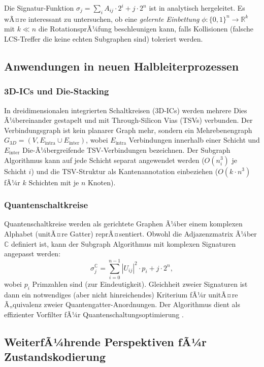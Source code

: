 ﻿\documentclass[a4paper,12pt]{article}
\theoremstyle{definition}
\begin{document}
Die Signatur-Funktion $\sigma_j = \sum_i A_{ij} \cdot 2^i + j \cdot 2^n$ ist in
\cite{subgraph2026} analytisch hergeleitet. Es wÃ¤re interessant zu untersuchen, ob
eine \emph{gelernte Einbettung} $\phi: \{0,1\}^n \to \mathbb{R}^k$ mit $k \ll n$
die RotationsprÃ¼fung beschleunigen kann, falls Kollisionen (falsche LCS-Treffer die
keine echten Subgraphen sind) toleriert werden.

\subsection{Anwendungen in neuen Halbleiterprozessen}

\subsubsection{3D-ICs und Die-Stacking}

In dreidimensionalen integrierten Schaltkreisen (3D-ICs) werden mehrere Dies Ã¼bereinander
gestapelt und mit Through-Silicon Vias (TSVs) verbunden. Der Verbindungsgraph ist kein
planarer Graph mehr, sondern ein Mehrebenengraph $G_{3D} = (V, E_{\text{intra}} \cup E_{\text{inter}})$,
wobei $E_{\text{intra}}$ Verbindungen innerhalb einer Schicht und $E_{\text{inter}}$
Die-Ã¼bergreifende TSV-Verbindungen bezeichnen. Der Subgraph Algorithmus kann auf
jede Schicht separat angewendet werden ($O(n_i^3)$ je Schicht $i$) und die TSV-Struktur
als Kantenannotation einbeziehen ($O(k \cdot n^3)$ fÃ¼r $k$ Schichten mit je $n$ Knoten).

\subsubsection{Quantenschaltkreise}

Quantenschaltkreise werden als gerichtete Graphen Ã¼ber einem komplexen Alphabet
(unitÃ¤re Gatter) reprÃ¤sentiert. Obwohl die Adjazenzmatrix Ã¼ber $\mathbb{C}$ definiert
ist, kann der Subgraph Algorithmus mit komplexen Signaturen angepasst werden:
\[
  \sigma_j^{\mathbb{C}} = \sum_{i=0}^{n-1} |U_{ij}|^2 \cdot p_i + j \cdot 2^n,
\]
wobei $p_i$ Primzahlen sind (zur Eindeutigkeit). Gleichheit zweier Signaturen ist dann
ein notwendiges (aber nicht hinreichendes) Kriterium fÃ¼r unitÃ¤re Ã„quivalenz zweier
Quantengatter-Anordnungen. Der Algorithmus dient als effizienter Vorfilter fÃ¼r
Quantenschaltungsoptimierung \cite{nielsen2000quantum}.

\subsection{WeiterfÃ¼hrende Perspektiven fÃ¼r Zustandskodierung}
\end{document}
